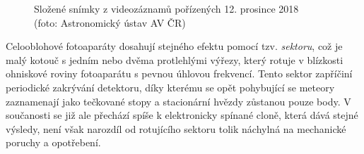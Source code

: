 \begin{figure}[p]
    \centering
    \caption[Složené snímky z videozáznamů]{
        Složené snímky z videozáznamů pořízených 12. prosince 2018\\
        {\small (foto: Astronomický ústav AV ČR)}
    }
    \label{img:observation:video-stitch}
\end{figure}

Celooblohové fotoaparáty dosahují stejného efektu pomocí tzv. \textit{sektoru}, což je malý kotouč s jedním nebo dvěma protlehlými výřezy, který rotuje v blízkosti ohniskové roviny fotoaparátu \cite{ceplecha} s pevnou úhlovou frekvencí. Tento sektor zapříčiní periodické zakrývání detektoru, díky kterému se opět pohybující se meteory zaznamenají jako tečkované stopy a stacionární hvězdy zůstanou pouze body. V součanosti se již ale přechází spíše k elektronicky spínané cloně, která dává stejné výsledy, není však narozdíl od rotujícího sektoru tolik náchylná na mechanické poruchy a opotřebení.


